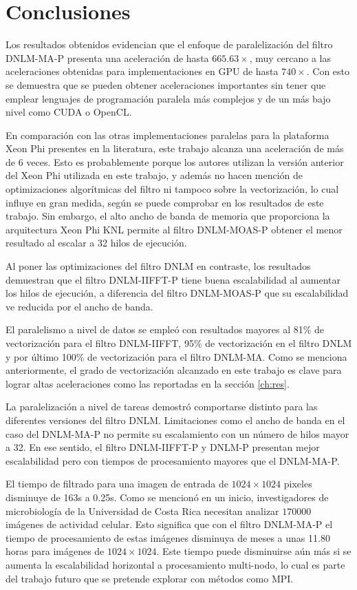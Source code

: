 \chapter{Conclusiones}
\label{ch:concl}

Los resultados obtenidos evidencian que el enfoque de paralelización del filtro DNLM-MA-P presenta una aceleración de hasta $665.63\times$, muy cercano a las aceleraciones obtenidas para implementaciones en GPU de hasta $740\times$. Con esto se demuestra que se pueden obtener aceleraciones importantes sin tener que emplear lenguajes de programación paralela más complejos y de un más bajo nivel como CUDA o OpenCL.


En comparación con las otras implementaciones paralelas para la plataforma Xeon Phi presentes en la literatura, este trabajo alcanza una aceleración de más de 6 veces. Esto es probablemente porque los autores utilizan la versión anterior del Xeon Phi utilizada en este trabajo, y además no hacen mención de optimizaciones algorítmicas del filtro ni tampoco sobre la vectorización, lo cual influye en gran medida, según se puede comprobar en los resultados de este trabajo. Sin embargo, el alto ancho de banda de memoria que proporciona la arquitectura Xeon Phi KNL permite al filtro DNLM-MOAS-P obtener el menor resultado al escalar a 32 hilos de ejecución.

Al poner las optimizaciones del filtro DNLM en contraste, los resultados demuestran que el filtro DNLM-IIFFT-P tiene buena escalabilidad al aumentar los hilos de ejecución, a diferencia del filtro DNLM-MOAS-P que su escalabilidad ve reducida por el ancho de banda. 

El paralelismo a nivel de datos se empleó con resultados mayores al 81\% de vectorización para el filtro DNLM-IIFFT, 95\% de vectorización en el filtro DNLM y por último 100\% de vectorización para el filtro DNLM-MA. Como se menciona anteriormente, el grado de vectorización alcanzado en este trabajo es clave para lograr altas aceleraciones como las reportadas en la sección \ref{ch:res}.

La paralelización a nivel de tareas demostró comportarse distinto para las diferentes versiones del filtro DNLM. Limitaciones como el ancho de banda en el caso del DNLM-MA-P no permite su escalamiento con un número de hilos mayor a 32. En ese sentido, el filtro DNLM-IIFFT-P y DNLM-P presentan mejor escalabilidad pero con tiempos de procesamiento mayores que el DNLM-MA-P.

El tiempo de filtrado para una imagen de entrada de $1024\times1024$ pixeles disminuye de 163s a 0.25s. Como se mencionó en un inicio, investigadores de microbiología de la Universidad de Costa Rica necesitan analizar $170000$ imágenes de actividad celular. Esto significa que con el filtro DNLM-MA-P el tiempo de procesamiento de estas imágenes disminuya de meses a unas 11.80 horas para imágenes de $1024\times1024$. Este tiempo puede disminuirse aún más si se aumenta la escalabilidad horizontal a procesamiento multi-nodo, lo cual es parte del trabajo futuro que se pretende explorar con métodos como MPI.

